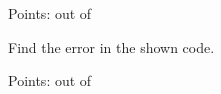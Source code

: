 \documentclass[11pt]{exam}
\newcommand{\gridandpoints}{\fillwithgrid{\fill}
\hfill Points: \framebox[1.5cm]{} out of \pointsofquestion{\thequestion}
\newpage}
\begin{document}
\begin{questions}
\begin{parts}
\part 
\part 
\end{parts} 


\gridandpoints


\question[2] Find the error in the shown code.


\gridandpoints



\question[4]  







\end{questions}
\end{document}
